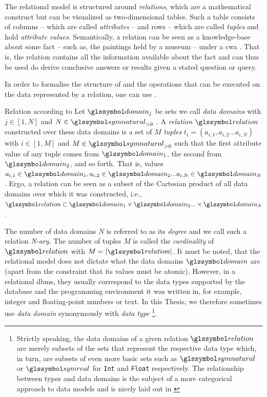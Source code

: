 The relational model is structured around \emph{relations}, which are a mathematical construct but can be visualized as two-dimensional tables. Such a table consists of columns -- which are called \emph{attributes} -- and rows -- which are called \emph{tuples} and hold \emph{attribute values}. Semantically, a relation can be seen as a knowledge-base about some fact -- such as, the paintings held by a museum -- under a \acrfull{cwa} \cite{Reiter:1981Closed}. That is, the relation contains all the information available about the fact and can thus be used do derive conclusive answers or results given a stated question or query.

In order to formalise the structure of and the operations that can be executed on the data represented by a relation, one can use . 

\begin{definition}[label=definition:relation]{Relation according to \cite{Codd:1970Relational}}{}
    Let $\domain_j$ be sets we call \emph{data domains} with $j \in \left[ 1, N \right]$ and $N \in \symnatural_{> 0}$ . A \emph{relation} $\relation$ constructed over these data domains is a set of $M$ \emph{tuples} $t_i = (a_{i,1}, a_{i,2} ... a_{i,N})$ with $i \in \left[ 1, M \right]$ and $M \in \symnatural_{> 0}$ such that the first attribute value of any tuple comes from $\domain_1$, the second from $\domain_2$, and so forth. That is, values $a_{i,1} \in \domain_1, a_{i,2} \in \domain_2 ... a_{i,N} \in \domain_N$. Ergo, a relation can be seen as a subset of the Cartesian product of all data domains over which it was constructed, i.e., $\relation \subset \domain_1 \times \domain_2 ... \times \domain_N$.
\end{definition}

The number of data domains $N$ is referred to as its \emph{degree} and we call such a relation \emph{N-ary}. The number of tuples $M$ is called the \emph{cardinality} of $\relation$ with $M = |\relation|$. It must be noted, that the relational model does not dictate what the data domains $\domain$ are (apart from the constraint that its values must be atomic). However, in a relational \acrshort{dbms}, they usually correspond to the data types supported by the database and the programming environment it was written in, for example, integer and floating-point numbers or text. In this Thesis, we therefore sometimes use \emph{data domain} synonymously with \emph{data type} \footnote{Strictly speaking, the data domains of a given relation $\relation$ are merely subsets of the sets that represent the respective data type which, in turn, are subsets of even more basic sets such as $\symnatural$ or $\symreal$ for \lstinline{Int} and \lstinline{Float} respectively. The relationship between types and data domains is the subject of a more categorical approach to data models and is nicely laid out in \cite{Spivak:2009Simplicial}}.


